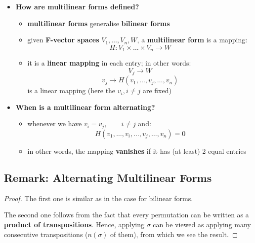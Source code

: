 \documentclass{exam}
\begin{document}
\begin{itemize}
    \item \textbf{How are multilinear forms defined?}
    \begin{itemize}
        \item \textbf{multilinear forms} generalise \textbf{bilinear forms}
        \item given \textbf{F-vector spaces} $V_1,\ldots,V_n,W$, a \textbf{multilinear form} is a mapping:
        \[
        H : V_1 \times \ldots \times V_n \to W
        \]
        \item it is a \textbf{linear mapping} in each entry; in other words:
        \[
        V_j \to W
        \]
        \[
        v_j \to H(v_1, \ldots, v_j, \ldots, v_n)
        \]
        is a linear mapping (here the $v_i, i\neq j$ are fixed)
    \end{itemize}
    \item \textbf{When is a multilinear form alternating?}
    \begin{itemize}
        \item whenever we have $v_i = v_j, \qquad i \neq j$ and:
        \[
        H(v_1, \ldots, v_i, \ldots, v_j, \ldots, v_n) = 0
        \]
        \item in other words, the mapping \textbf{vanishes} if it has (at least) 2 equal entries
    \end{itemize}
\end{itemize}

\subsection{Remark: Alternating Multilinear Forms}


\begin{proof}

The first one is similar as in the case for bilinear forms.

\bigskip

The second one follows from the fact that every permutation can be written as a \textbf{product of transpositions}. Hence, applying $\sigma$ can be viewed as applying many consecutive transpositions ($n(\sigma)$ of them), from which we see the result.

\end{proof}
\end{document}

